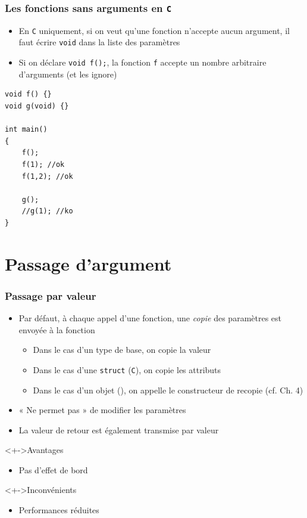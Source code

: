 \begin{frame}[containsverbatim]
\frametitle{Les fonctions sans arguments en \texttt{C}}
\begin{itemize}
\item En \texttt{C} uniquement, si on veut qu'une fonction n'accepte aucun argument, il faut écrire \lstinline|void| dans la liste des paramètres
\item Si on déclare \lstinline|void f();|, la fonction \texttt{f} accepte un nombre arbitraire d'arguments (et les ignore)
\end{itemize}
\begin{lstlisting}
void f() {}
void g(void) {}

int main()
{
    f();
    f(1); //ok
    f(1,2); //ok
    
    g();
    //g(1); //ko    
}
\end{lstlisting}
\end{frame}

\section{Passage d'argument}

\begin{frame}
\frametitle{Passage par valeur}
\begin{itemize}[<+->]
\item Par défaut, à chaque appel d'une fonction, une \emph{copie} des paramètres est envoyée à la fonction
	\begin{itemize}
	\item Dans le cas d'un type de base, on copie la valeur
	\item Dans le cas d'une \lstinline|struct| (\texttt{C}), on copie les attributs
	\item Dans le cas d'un objet (\cpp), on appelle le constructeur de recopie (cf. Ch. 4)
	\end{itemize}
\item « Ne permet pas » de modifier les paramètres
\item La valeur de retour est également transmise par valeur	
\end{itemize}
\begin{exampleblock}<+->{Avantages}
	\begin{itemize}[<+->]
	\item Pas d'effet de bord
	\end{itemize}
\end{exampleblock}
\begin{alertblock}<+->{Inconvénients}
	\begin{itemize}[<+->]
	\item Performances réduites
	\end{itemize}
\end{alertblock}
\end{frame}

